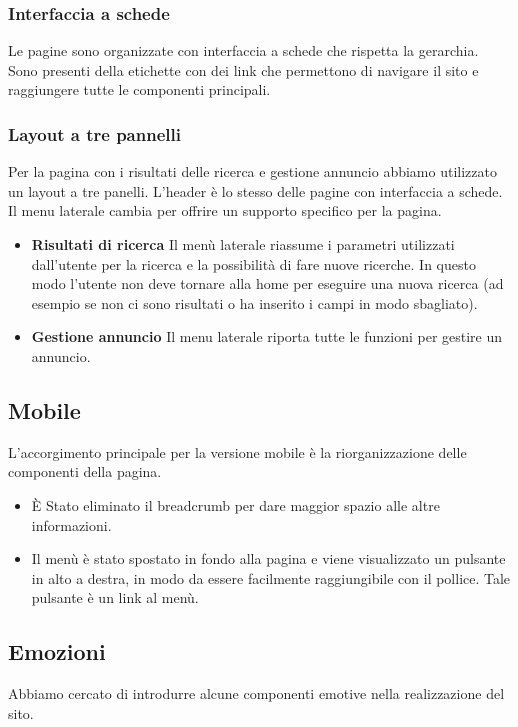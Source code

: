 \documentclass[1_relazione.tex]{subfiles}
\begin{document}
    \subsubsection{Interfaccia a schede}
    Le pagine sono organizzate con interfaccia a schede che rispetta la gerarchia. Sono presenti della etichette con dei link che permettono di navigare il sito e raggiungere tutte le componenti principali.
    \subsubsection{Layout a tre pannelli}
    Per la pagina con i risultati delle ricerca e gestione annuncio abbiamo utilizzato un layout a tre panelli. L'header \`{e} lo stesso delle pagine con interfaccia a schede. Il menu laterale cambia per offrire un supporto specifico per la pagina.

    \begin{itemize}
        \item \textbf{Risultati di ricerca} Il men\`{u} laterale riassume i parametri utilizzati dall'utente per la ricerca e la possibilit\`{a} di fare nuove ricerche. In questo modo l'utente non deve tornare alla home per eseguire una nuova ricerca (ad esempio se non ci sono risultati o ha inserito i campi in modo sbagliato).
        \item \textbf{Gestione annuncio} Il menu laterale riporta tutte le funzioni per gestire un annuncio.
    \end{itemize}

    \subsection{Mobile}
    L'accorgimento principale per la versione mobile è la riorganizzazione delle componenti della pagina.\\
    \begin{itemize}
        \item \`{E} Stato eliminato il breadcrumb per dare maggior spazio alle altre informazioni.
        \item Il menù è stato spostato in fondo alla pagina e viene visualizzato un pulsante in alto a destra, in modo da essere facilmente raggiungibile con il pollice. Tale pulsante è un link al menù.
    \end{itemize}



    \subsection{Emozioni}
    Abbiamo cercato di introdurre alcune componenti emotive nella realizzazione del sito.
\end{document}
